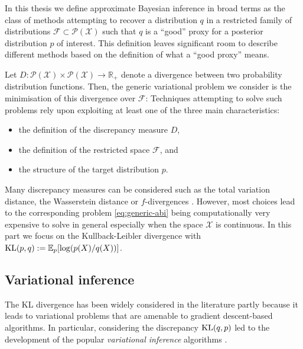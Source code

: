 
In this thesis we define approximate Bayesian inference in broad terms as the class of methods attempting to recover a distribution $q$ in a restricted family of distributions $\mathcal F\subset \mathcal P(\mathcal X)$ such that $q$ is a ``good'' proxy for a posterior distribution $p$ of interest. 
This definition leaves significant room to describe different methods based on the definition of what a ``good proxy'' means. 

Let $D:\mathcal P(\mathcal X)\times \mathcal P(\mathcal X)\to \mathbb R_{+}$ denote a divergence between two probability distribution functions. Then, the generic variational problem we consider is the minimisation of this divergence over $\mathcal F$:
%
%
Techniques attempting to solve such problems rely upon exploiting at least one of the three main characteristics: 
\begin{itemize}\itsepa
\item the definition of the discrepancy measure $D$, 
\item the definition of the restricted space $\mathcal F$, and
\item the structure of the target distribution $p$. 
\end{itemize}
Many discrepancy measures can be considered such as the total variation distance, the Wasserstein distance or $f$-divergences \citep{minka04, blei16, li16, bernton17}. However, most choices lead to the corresponding problem \eqref{eq:generic-abi} being computationally very expensive to solve in general especially when the space $\mathcal X$ is continuous. In this part we focus on the Kullback-Leibler divergence \citep{kullback51} with $\mathrm{KL}\!\left(p,q\right):=\mathbb E_{p}[\log (p(X)/q(X))]$.

\subsection{Variational inference}
The KL divergence has been widely considered in the literature partly because it leads to variational problems that are amenable to gradient descent-based algorithms. 
In particular, considering the discrepancy $\mathrm{KL}\!\left(q,p\right)$ led to the development of the popular \emph{variational inference} algorithms \citep{hoffman13,blei16}. 

